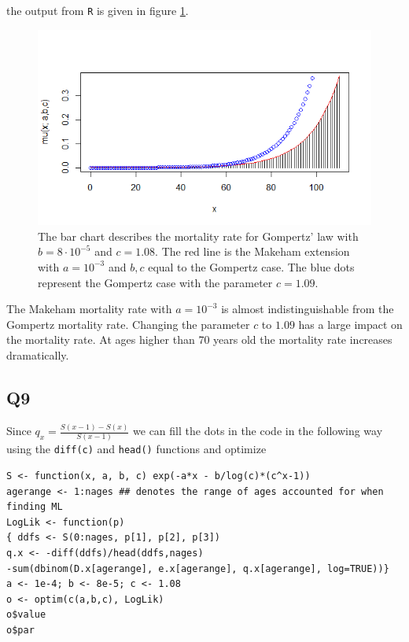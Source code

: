 the output from \verb|R| is given in figure \ref{Figure_Question8}.
\begin{center}
\begin{figure}[H]

\includegraphics[scale=1]{Question_8_MakehamGompertz.png}

\caption{The bar chart describes the mortality rate for Gompertz' law with $b = 8 \cdot 10^{-5}$ and $c=1.08$. The red line is the Makeham extension with $a=10^{-3}$ and $b,c$ equal to the Gompertz case. The blue dots represent the Gompertz case with the parameter $c = 1.09$.}
\label{Figure_Question8}

\end{figure}
\end{center}

The Makeham mortality rate with $a = 10^{-3}$ is almost indistinguishable from the Gompertz mortality rate. Changing the parameter $c$ to $1.09$ has a large impact on the mortality rate. At ages higher than 70 years old the mortality rate increases dramatically.


\subsection*{Q9}

Since $q_x = \frac{S(x-1) - S(x)}{S(x-1)}$ we can fill the dots in the code in the following way using the \verb+diff(c)+ and \verb+head()+ functions and optimize

\begin{verbatim}
S <- function(x, a, b, c) exp(-a*x - b/log(c)*(c^x-1))
agerange <- 1:nages ## denotes the range of ages accounted for when finding ML
LogLik <- function(p)
{ ddfs <- S(0:nages, p[1], p[2], p[3])
q.x <- -diff(ddfs)/head(ddfs,nages)
-sum(dbinom(D.x[agerange], e.x[agerange], q.x[agerange], log=TRUE))}
a <- 1e-4; b <- 8e-5; c <- 1.08
o <- optim(c(a,b,c), LogLik) 
o$value
o$par
\end{verbatim}

